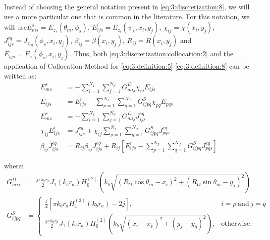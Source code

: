 			Instead of choosing the general notation present in \eqref{eq:3:discretization:8}, we will use a more particular one that is common in the literature. For this notation, we will use$E^s_{ms} = E_{z_s}(\theta_m,\phi_s)$, $E^i_{ijs} = E_{z_i}(\psi_s,x_i,y_j)$, $\chi_{ij} = \chi(x_i,y_j)$, $J^{eq}_{ijs} = J_{z_{eq}}(\phi_s,x_i,y_j)$, $\beta_{ij}=\beta(x_i,y_j)$, $R_{ij}=R(x_i,y_j)$ and $E_{ijs} = E_z(\phi_s,x_i,y_j)$. Thus, both \eqref{eq:3:discretization:collocation:2} and the application of Collocation Method for \eqref{eq:3:definition:5}-\eqref{eq:3:definition:8} can be written as:
			\begin{align}
				E^s_{ms} &= -\sum\limits_{i=1}^{N_I}\sum\limits_{j=1}^{N_J} G^D_{mij} \chi_{ij} E_{ijs} \label{eq:3:discretization:collocation:3} \\
				E_{ijs} &= E^i_{ijs} - \sum\limits_{p=1}^{N_I}\sum\limits_{q=1}^{N_J} G^S_{ijpq} \chi_{pq} E_{pqs} \label{eq:3:discretization:collocation:4} \\
				E^s_{ms} &= -\sum\limits_{i=1}^{N_I}\sum\limits_{j=1}^{N_J} G^D_{mij} J^{eq}_{ijs} \label{eq:3:discretization:collocation:5} \\
				\chi_{ij} E^i_{ijs}& = J^{eq}_{ijs} + \chi_{ij} \sum\limits_{p=1}^{N_I}\sum\limits_{q=1}^{N_J} G^S_{ijpq} J^{eq}_{pqs} \label{eq:3:discretization:collocation:6} \\
				\beta_{ij} J^{eq}_{ijs} &= R_{ij}\beta_{ij}J^{eq}_{ijs} + R_{ij}\left[E^i_{ijs}-\sum\limits_{p=1}^{N_I}\sum\limits_{q=1}^{N_J} G^S_{ijpq} J^{eq}_{pqs} \right] \label{eq:3:discretization:collocation:7}
			\end{align}
		
			\noindent where:
			\begin{align}
				G^D_{mij} &= \frac{j\pi k_b r_a}{2} J_1(k_br_a) H^{(2)}_0(k_b\sqrt{(R_O\cos\theta_m-x_i)^2+(R_O\sin\theta_m-y_j)^2}) \label{eq:3:discretization:collocation:8} \\
				G^S_{ijpq} &= \begin{cases}
									      \frac{j}{2}\left[ \pi k_br_a H^{(2)}_1(k_br_a) -2j \right],& i=p ~\mathrm{and}~ j=q \\
									      \frac{j\pi k_b r_a}{2} J_1(k_br_a) H^{(2)}_0(k_b\sqrt{(x_i-x_p)^2+(y_j-y_q)^2}),& \mathrm{otherwise.}
				                      \end{cases} \label{eq:3:discretization:collocation:9}
			\end{align}
		
